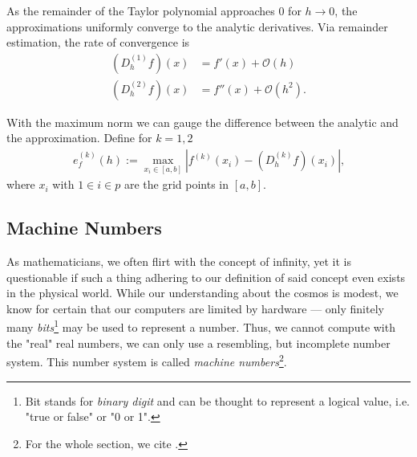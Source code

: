 As the remainder of the Taylor polynomial approaches \(0\) for \(h \rightarrow 0\), the approximations uniformly converge to the analytic derivatives. Via remainder estimation, the rate of convergence is
\begin{align*}
    (D^{(1)}_h f) (x) &= f'(x) + \mathcal{O}(h) \\
    (D^{(2)}_h f) (x) &= f''(x) + \mathcal{O}(h^2) \text{.}
\end{align*}

\noindent With the maximum norm we can gauge the difference between the analytic and the approximation. Define for \(k = 1, 2\)
\begin{align*}
    e^{(k)}_f (h) := \max_{x_i \in [a, b]} \left| f^{(k)} (x_i) - (D^{(k)}_h f) (x_i)\right| \text{,}
\end{align*}
where \(x_i\) with \(1 \in i \in p\) are the grid points in \([a, b]\).

\subsection{Machine Numbers}\label{cha:machine}

As mathematicians, we often flirt with the concept of infinity, yet it is questionable if such a thing adhering to our definition of said concept even exists in the physical world. While our understanding about the cosmos is modest, we know for certain that our computers are limited by hardware --- only finitely many \textit{bits}\footnote{Bit stands for \textit{binary digit} and can be thought to represent a logical value, i.e. "true or false" or "0 or 1".} may be used to represent a number. Thus, we cannot compute with the "real" real numbers, we can only use a resembling, but incomplete number system. This number system is called \textit{machine numbers}\footnote{For the whole section, we cite \cite{EWR}.}.

